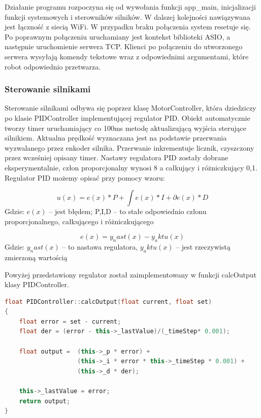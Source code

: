 Działanie programu rozpoczyna się od wywołania funkcji app\_main, inicjalizacji funkcji systemowych i sterowników silników.
W dalszej kolejności nawiązywana jest łączność z siecią WiFi. W przypadku braku połączenia system resetuje się. 
Po poprawnym połączeniu uruchamiany jest kontekst biblioteki ASIO, a następnie uruchomienie serwera TCP.
Klienci po połączeniu do utworzonego serwera wysyłają komendy tekstowe wraz z odpowiednimi argumentami, które
robot odpowiednio przetwarza. 

\subsubsection{Sterowanie silnikami}
Sterowanie silnikami odbywa się poprzez klasę MotorController, która dziedziczy po klasie PIDController implementującej regulator PID.
Obiekt automatycznie tworzy timer uruchamiający co 100ms metodę aktualizującą wyjścia sterujące silnikiem. 
Aktualna prędkość wyznaczana jest na podstawie przerwania wyzwalanego przez enkoder silnika. Przerwanie inkrementuje licznik, 
czyszczony przez wcześniej opisany timer. Nastawy regulatora PID zostały dobrane eksperymentalnie, człon proporcjonalny wynosi 8 a całkujący i różniczkujący 0,1. 
Regulator PID możemy opisać przy pomocy wzoru:

\begin{equation}
	u(x) = e(x) * P + \int{e(x)} * I + \partial{e(x)} * D 
	\label{Eq:PID}
\end{equation}
Gdzie: $e(x)$ -- jest błędem; P,I,D -- to stałe odpowiednio członu proporcjonalnego, całkującego i różniczkującego

\begin{equation}
	e(x) = y_nast(x) - y_aktu(x)
	\label{Eq:blad}
\end{equation}
Gdzie: $y_nast(x)$ -- to nastawa regulatora, $y_aktu(x)$ -- jest rzeczywistą zmierzoną wartością
 
Powyżej przedstawiony regulator został zaimplementowany w funkcji calcOutput klasy PIDController.

\begin{lstlisting}[language=C++,caption=Zaimplementowany w C++ regulator PID,label={kodCPPPIDOutput}]
float PIDController::calcOutput(float current, float set)
{
	float error = set - current;
	float der = (error - this->_lastValue)/(_timeStep* 0.001);
	
	float output =  (this->_p * error) + 
					(this->_i * error * this->_timeStep * 0.001) + 
					(this->_d * der);

	this->_lastValue = error;
	return output;
}
\end{lstlisting}

